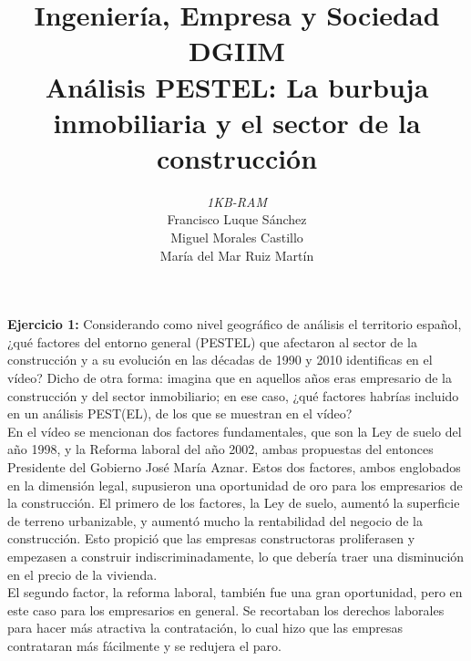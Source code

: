 \documentclass[11pt]{article}
\theoremstyle{plain}
\theoremstyle{definition}
\begin{document}
\title{Ingeniería, Empresa y Sociedad \\
  DGIIM \\
  \large Análisis PESTEL: La burbuja inmobiliaria y el sector de la
  construcción}
\author{\textit{1KB-RAM}\\
  Francisco Luque Sánchez\\
  Miguel Morales Castillo\\
  María del Mar Ruiz Martín}

\maketitle

\textbf{Ejercicio 1:} Considerando como nivel geográfico de análisis
el territorio español, ¿qué factores del entorno general (PESTEL) que
afectaron al sector de la construcción y a su evolución en las décadas
de 1990 y 2010 identificas en el vídeo? Dicho de otra forma: imagina
que en aquellos años eras empresario de la construcción y del sector
inmobiliario; en ese caso, ¿qué factores habrías incluido en un
análisis PEST(EL), de los que se muestran en el vídeo?\\

En el vídeo se mencionan dos factores fundamentales, que son la Ley de
suelo del año 1998, y la Reforma laboral del año 2002, ambas
propuestas del entonces Presidente del Gobierno José María
Aznar. Estos dos factores, ambos englobados en la dimensión legal,
supusieron una oportunidad de oro para los empresarios de la
construcción. El primero de los factores, la Ley de suelo, aumentó la
superficie de terreno urbanizable, y aumentó mucho la rentabilidad del
negocio de la construcción. Esto propició que las empresas
constructoras proliferasen y empezasen a construir
indiscriminadamente, lo que debería
traer una disminución en el precio de la vivienda.\\

El segundo factor, la reforma laboral, también fue una gran
oportunidad, pero en este caso para los empresarios en general. Se
recortaban los derechos laborales para hacer más atractiva la
contratación, lo cual hizo que las empresas contrataran más fácilmente
y se redujera el paro.\\
\end{document}
